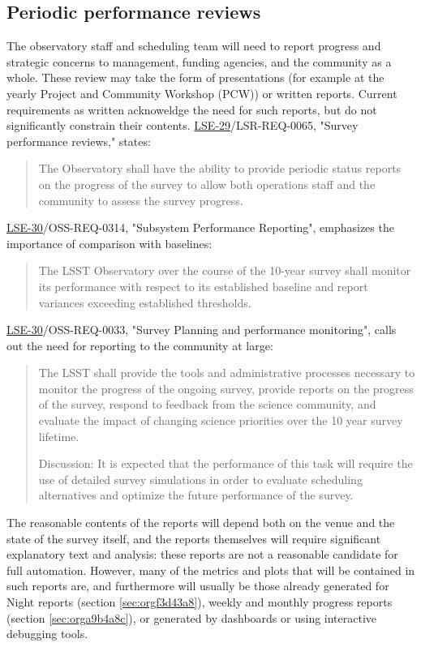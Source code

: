 \subsection{Periodic performance reviews}
\label{sec:org55155e7}
The observatory staff and scheduling team will need to report progress and strategic concerns to management, funding agencies, and the community as a whole.
These review may take the form of presentations (for example at the yearly Project and Community Workshop (PCW)) or written reports.
Current requirements as written acknoweldge the need for such reports, but do not significantly constrain their contents. 
\href{https://ls.st/lse-29}{LSE-29}/LSR-REQ-0065, "Survey performance reviews," states:
\begin{quote}
The Observatory shall have the ability to provide periodic status
reports on the progress of the survey to allow both operations staff
and the community to assess the survey progress.
\end{quote}
\href{https://ls.st/lse-30}{LSE-30}/OSS-REQ-0314, "Subsystem Performance Reporting", emphasizes the importance of comparison with baselines:
\begin{quote}
The LSST Observatory over the course of the 10-year survey shall monitor its performance with respect to its established baseline and report variances exceeding established thresholds.
\end{quote}
\href{https://ls.st/lse-30}{LSE-30}/OSS-REQ-0033, "Survey Planning and performance monitoring", calls out the need for reporting to the community at large:
\begin{quote}
The LSST shall provide the tools and administrative processes
necessary to monitor the progress of the ongoing survey, provide
reports on the progress of the survey, respond to feedback from the
science community, and evaluate the impact of changing science
priorities over the 10 year survey lifetime.

Discussion: It is expected that the performance of this task will
require the use of detailed survey simulations in order to evaluate
scheduling alternatives and optimize the future performance of the
survey.
\end{quote}

The reasonable contents of the reports will depend both on the venue and the state of the survey itself, and the reports themselves will require significant explanatory text and analysis: these reports are not a reasonable candidate for full automation.
However, many of the metrics and plots that will be contained in such reports are, and furthermore will usually be those already generated for Night reports (section \ref{sec:orgf3d43a8}), weekly and monthly progress reports (section \ref{sec:orga9b4a8c}), or generated by dashboards or using interactive debugging tools.

